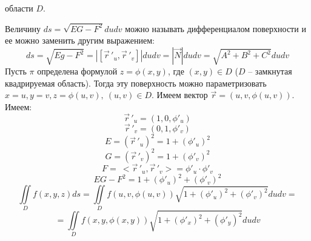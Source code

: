 \documentclass[../../main.tex]{subfiles}
\begin{document}
    области
     $D$.\\
    \begin{rem}
    Величину $ds = \sqrt{EG - F^2} du dv$ можно называть
     дифференциалом поверхности и ее можно заменить другим выражением:
    \[ds = \sqrt{Eg - F^2} = |[\vec r\,'_u, \vec r\,'_v]| 
    du dv =
     |\vec{N}| du dv = \sqrt{A^2 + B^2 + C^2} du dv \] 	
    Пусть $\pi$ определена формулой $z= \phi(x,y)$, где $(x,y) \in D$ ($D$ \---
     замкнутая квадрируемая область). Тогда эту поверхность можно 
     параметризовать
      $x=u, y = v, z= \phi(u,v), \ (u, v) \in D$. Имеем вектор 
      $\vec{r} =
       (u, v, \phi(u,v))$. Имеем:
    \[\vec r\,'_u = (1, 0, \phi'_u) \] 
    \[\vec r\,'_v = (0, 1, \phi'_v)\]
	\[E =(\vec r\,'_u)^2 = 1 + (\phi'_u)^2\]
	\[G =(\vec r\,'_v)^2 = 1 + (\phi'_v)^2\]
	\[F = \ <\vec r\,'_u, \vec r\,'_v> = \phi'_u \cdot 
	\phi'_v\]
	\[EG - F^2 = 1 + (\phi'_u)^2 + (\phi'_v)^2 \]
	\[\iint \limits_D f(x, y, z)ds = \iint \limits_D f(u,v, \phi(u,v)) \sqrt{1 +
		 (\phi'_u)^2 + (\phi'_v)^2} dudv = \] \[= \iint \limits_D f(x,y, \phi(x,y))
	  \sqrt{1 + (\phi'_x)^2 + (\phi'_y)^2} dudv \]
	\end{rem}
\end{document}

